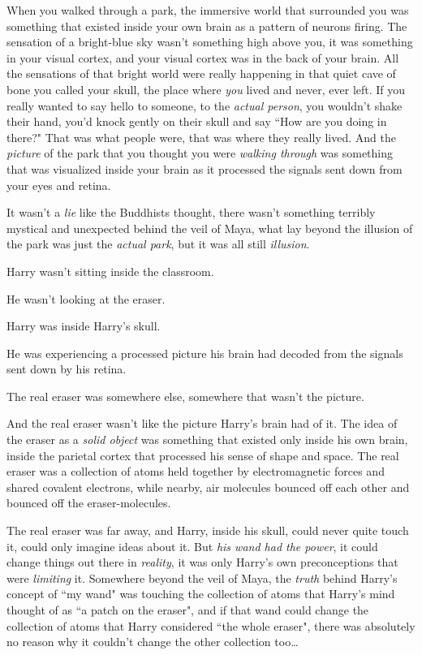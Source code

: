 When you walked through a park, the immersive world that surrounded you was something that existed inside your own brain as a pattern of neurons firing. The sensation of a bright-blue sky wasn't something high above you, it was something in your visual cortex, and your visual cortex was in the back of your brain. All the sensations of that bright world were really happening in that quiet cave of bone you called your skull, the place where \emph{you} lived and never, ever left. If you really wanted to say hello to someone, to the \emph{actual person}, you wouldn't shake their hand, you'd knock gently on their skull and say ``How are you doing in there?" That was what people were, that was where they really lived. And the \emph{picture} of the park that you thought you were \emph{walking through} was something that was visualized inside your brain as it processed the signals sent down from your eyes and retina.

It wasn't a \emph{lie} like the Buddhists thought, there wasn't something terribly mystical and unexpected behind the veil of Maya, what lay beyond the illusion of the park was just the \emph{actual park}, but it was all still \emph{illusion}.

Harry wasn't sitting inside the classroom.

He wasn't looking at the eraser.

Harry was inside Harry's skull.

He was experiencing a processed picture his brain had decoded from the signals sent down by his retina.

The real eraser was somewhere else, somewhere that wasn't the picture.

And the real eraser wasn't like the picture Harry's brain had of it. The idea of the eraser as a \emph{solid object} was something that existed only inside his own brain, inside the parietal cortex that processed his sense of shape and space. The real eraser was a collection of atoms held together by electromagnetic forces and shared covalent electrons, while nearby, air molecules bounced off each other and bounced off the eraser-molecules.

The real eraser was far away, and Harry, inside his skull, could never quite touch it, could only imagine ideas about it. But \emph{his wand had the power}, it could change things out there in \emph{reality}, it was only Harry's own preconceptions that were \emph{limiting} it. Somewhere beyond the veil of Maya, the \emph{truth} behind Harry's concept of ``my wand" was touching the collection of atoms that Harry's mind thought of as ``a patch on the eraser", and if that wand could change the collection of atoms that Harry considered ``the whole eraser", there was absolutely no reason why it couldn't change the other collection too{\ldots}

